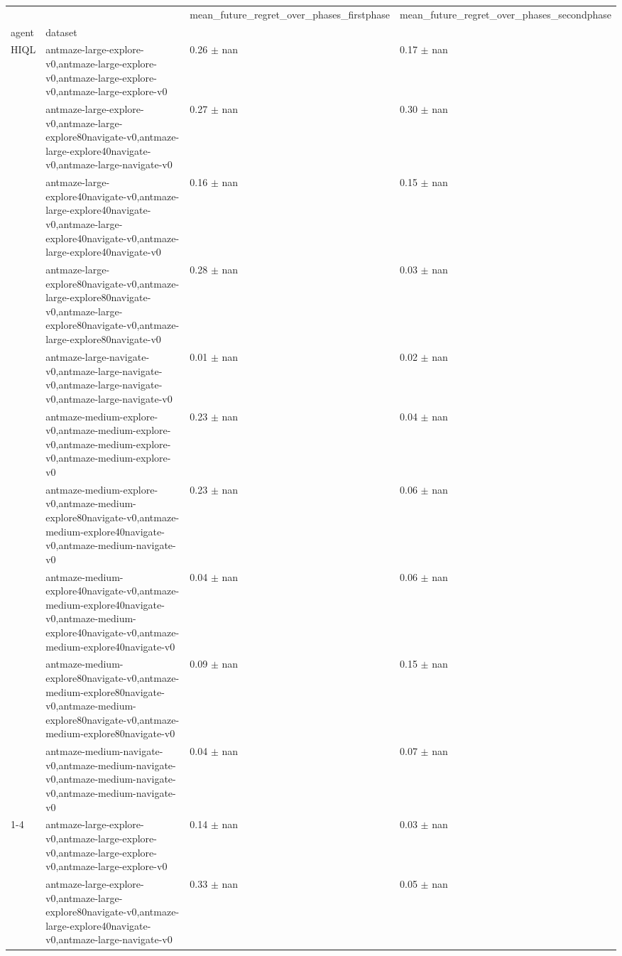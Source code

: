 \begin{tabular}{llll}
\toprule
 &  & mean_future_regret_over_phases_firstphase & mean_future_regret_over_phases_secondphase \\
agent & dataset &  &  \\
\midrule
\multirow[t]{10}{*}{HIQL} & antmaze-large-explore-v0,antmaze-large-explore-v0,antmaze-large-explore-v0,antmaze-large-explore-v0 & 0.26 $\pm$ nan & 0.17 $\pm$ nan \\
 & antmaze-large-explore-v0,antmaze-large-explore80navigate-v0,antmaze-large-explore40navigate-v0,antmaze-large-navigate-v0 & 0.27 $\pm$ nan & 0.30 $\pm$ nan \\
 & antmaze-large-explore40navigate-v0,antmaze-large-explore40navigate-v0,antmaze-large-explore40navigate-v0,antmaze-large-explore40navigate-v0 & 0.16 $\pm$ nan & 0.15 $\pm$ nan \\
 & antmaze-large-explore80navigate-v0,antmaze-large-explore80navigate-v0,antmaze-large-explore80navigate-v0,antmaze-large-explore80navigate-v0 & 0.28 $\pm$ nan & 0.03 $\pm$ nan \\
 & antmaze-large-navigate-v0,antmaze-large-navigate-v0,antmaze-large-navigate-v0,antmaze-large-navigate-v0 & 0.01 $\pm$ nan & 0.02 $\pm$ nan \\
 & antmaze-medium-explore-v0,antmaze-medium-explore-v0,antmaze-medium-explore-v0,antmaze-medium-explore-v0 & 0.23 $\pm$ nan & 0.04 $\pm$ nan \\
 & antmaze-medium-explore-v0,antmaze-medium-explore80navigate-v0,antmaze-medium-explore40navigate-v0,antmaze-medium-navigate-v0 & 0.23 $\pm$ nan & 0.06 $\pm$ nan \\
 & antmaze-medium-explore40navigate-v0,antmaze-medium-explore40navigate-v0,antmaze-medium-explore40navigate-v0,antmaze-medium-explore40navigate-v0 & 0.04 $\pm$ nan & 0.06 $\pm$ nan \\
 & antmaze-medium-explore80navigate-v0,antmaze-medium-explore80navigate-v0,antmaze-medium-explore80navigate-v0,antmaze-medium-explore80navigate-v0 & 0.09 $\pm$ nan & 0.15 $\pm$ nan \\
 & antmaze-medium-navigate-v0,antmaze-medium-navigate-v0,antmaze-medium-navigate-v0,antmaze-medium-navigate-v0 & 0.04 $\pm$ nan & 0.07 $\pm$ nan \\
\cline{1-4}
\multirow[t]{10}{*}{QRL} & antmaze-large-explore-v0,antmaze-large-explore-v0,antmaze-large-explore-v0,antmaze-large-explore-v0 & 0.14 $\pm$ nan & 0.03 $\pm$ nan \\
 & antmaze-large-explore-v0,antmaze-large-explore80navigate-v0,antmaze-large-explore40navigate-v0,antmaze-large-navigate-v0 & 0.33 $\pm$ nan & 0.05 $\pm$ nan \\

\end{tabular}
